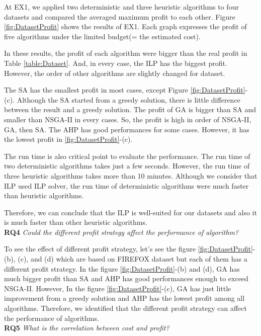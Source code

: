 At EX1, we applied two deterministic and three heuristic algorithms to four datasets and compared the averaged maximum profit to each other. Figure \ref{fig:DatasetProfit} shows the results of EX1. Each graph expresses the profit of five algorithms under the limited budget(= the estimated cost).

In these results, the profit of each algorithm were bigger than the real profit in Table \ref{table:Dataset}. And, in every case, the ILP has the biggest profit. However, the order of other algorithms are slightly changed for dataset.

The SA has the smallest profit in most cases, except Figure \ref{fig:DatasetProfit}-(c). Although the SA started from a greedy solution, there is little difference between the result and a greedy solution. The profit of GA is bigger than SA and smaller than NSGA-II in every cases. So, the profit is high in order of NSGA-II, GA, then SA. The AHP has good performances for some cases. However, it has the lowest profit in \ref{fig:DatasetProfit}-(c).

The run time is also critical point to evaluate the performance. The run time of two deterministic algorithms takes just a few seconds. However, the run time of three heuristic algorithms takes more than 10 minutes. Although we consider that ILP used ILP solver, the run time of deterministic algorithms were much faster than heuristic algorithms.

Therefore, we can conclude that the ILP is well-suited for our datasets and also it is much faster than other heuristic algorithms.\\


\textbf{RQ4} \textit{Could the different profit strategy affect the performance of algorithm?}

To see the effect of different profit strategy, let's see the figure \ref{fig:DatasetProfit}-(b), (c), and (d) which are based on FIREFOX dataset but each of them has a different profit strategy. In the figure \ref{fig:DatasetProfit}-(b) and (d), GA has much bigger profit than SA and AHP has good performances enough to exceed NSGA-II. However, In the figure \ref{fig:DatasetProfit}-(c), GA has just little improvement from a greedy solution and AHP has the lowest profit among all algorithms. Therefore, we identified that the different profit strategy can affect the performance of algorithms.\\

\textbf{RQ5} \textit{What is the correlation between cost and profit?}

